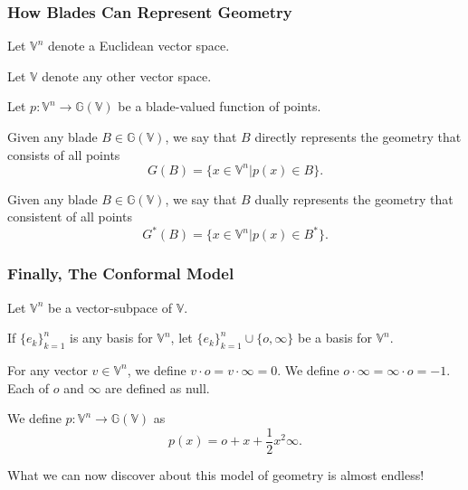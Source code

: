 \documentclass{beamer}
\newcommand{\G}{\mathbb{G}}
\newcommand{\V}{\mathbb{V}}
\newcommand{\nvao}{o}
\newcommand{\nvai}{\infty}
\begin{document}
\begin{frame}
\frametitle{How Blades Can Represent Geometry}
Let $\V^n$ denote a \alert{Euclidean} vector space.

Let $\V$ denote any other vector space.

Let $p:\V^n\to\G(\V)$ be a blade-valued function of points.
\begin{definition}
Given any blade $B\in\G(\V)$, we say that $B$ \alert{directly} represents
the geometry that consists of all points
\begin{equation*}
G(B) = \{x\in\V^n|p(x)\in B\}.
\end{equation*}
\end{definition}
\begin{definition}
Given any blade $B\in\G(\V)$, we say that $B$ \alert{dually} represents
the geometry that consistent of all points
\begin{equation*}
G^*(B) = \{x\in\V^n|p(x)\in B^*\}.
\end{equation*}
\end{definition}
\end{frame}


\begin{frame}
\frametitle{Finally, The Conformal Model}
Let $\V^n$ be a vector-subpace of $\V$.

If $\{e_k\}_{k=1}^n$ is any basis for $\V^n$, let $\{e_k\}_{k=1}^n\cup\{\nvao,\nvai\}$
be a basis for $\V^n$.
\begin{definition}
For any vector $v\in\V^n$, we define $v\cdot\nvao=v\cdot\nvai=0$.  We
define $\nvao\cdot\nvai=\nvai\cdot\nvao=-1$.  Each of $\nvao$ and $\nvai$
are defined as null.
\end{definition}
\begin{definition}
We define $p:\V^n\to\G(\V)$ as
\begin{equation*}
p(x) = \nvao + x + \frac{1}{2}x^2\nvai.
\end{equation*}
\end{definition}
What we can now discover about this model of geometry is almost endless!
\end{frame}
\end{document}
